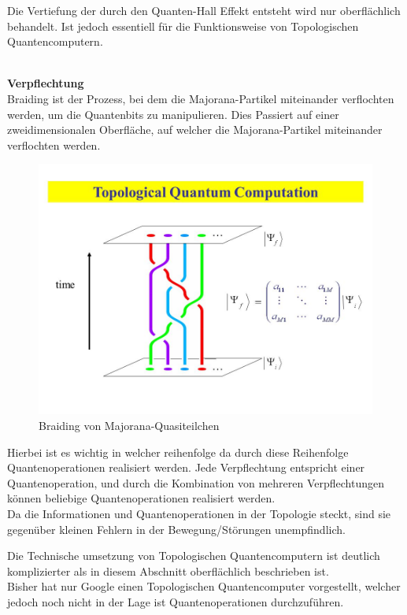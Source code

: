 \begin{tcolorbox}[title=Kommentar,
    title filled=false,
    colback=cyan!5!white,
    colframe=cyan!75!black]
    Die Vertiefung der durch den Quanten-Hall Effekt entsteht wird nur oberflächlich behandelt. Ist jedoch essentiell für die Funktionsweise von Topologischen Quantencomputern.
\end{tcolorbox}\\

\textbf{Verpflechtung}\\
Braiding ist der Prozess, bei dem die Majorana-Partikel miteinander verflochten werden, um die Quantenbits zu manipulieren. 
Dies Passiert auf einer zweidimensionalen Oberfläche, auf welcher die Majorana-Partikel miteinander verflochten werden.\\

\begin{figure}[!ht]
    \centering
    \includegraphics[width=0.75\linewidth]{img/TQC.png}
    \caption{Braiding von Majorana-Quasiteilchen}
    \label{fig:Braiding}
\end{figure}

Hierbei ist es wichtig in welcher reihenfolge da durch diese Reihenfolge Quantenoperationen realisiert werden.
Jede Verpflechtung entspricht einer Quantenoperation, und durch die Kombination von mehreren Verpflechtungen können beliebige Quantenoperationen realisiert werden.\\

Da die Informationen und Quantenoperationen in der Topologie steckt, sind sie gegenüber kleinen Fehlern in der Bewegung/Störungen unempfindlich.\\

\begin{tcolorbox}[title=Kommentar,
    title filled=false,
    colback=cyan!5!white,
    colframe=cyan!75!black]
    Die Technische umsetzung von Topologischen Quantencomputern ist deutlich komplizierter als in diesem Abschnitt oberflächlich beschrieben ist.\\
    Bisher hat nur Google einen Topologischen Quantencomputer vorgestellt, welcher jedoch noch nicht in der Lage ist Quantenoperationen durchzuführen.
\end{tcolorbox}\\